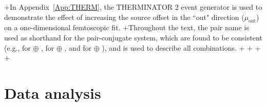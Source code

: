 +In Appendix~\ref{App:THERM}, the THERMINATOR 2 event generator is used to demonstrate the effect of increasing the source offset in the ``out" direction ($\mu_{\mathrm{out}}$) on a one-dimensional femtoscopic fit.
+Throughout the text, the pair name is used as shorthand for the pair-conjugate system, which are found to be consistent (e.g., \LamKchP for \LamKchP $\oplus$ \ALamKchM, \LamKchM for \LamKchM $\oplus$ \ALamKchP, and \LamKs for \LamKs $\oplus$ \ALamKs), and \LamK is used to describe all \LamK combinations.
+
+%
+%
+\section{Data analysis}
 \label{sec:DataAnalysis}
 
